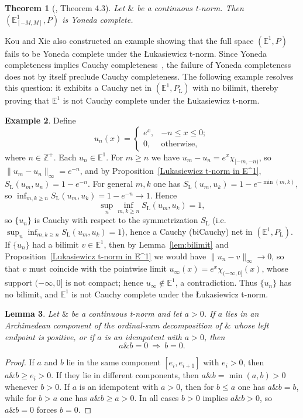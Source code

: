 \documentclass[preprint,3p,times]{elsarticle}
\theoremstyle{plain}
\newtheorem{thm}{Theorem}[section]
\newtheorem{lem}[thm]{Lemma}
\theoremstyle{definition}
\newtheorem{exmp}[thm]{Example}
\newcommand{\Luk}{\mathrm{L}}
\numberwithin{equation}{section}
\begin{document}
\begin{thm}[\cite{kouhui}, Theorem 4.3]\label{E^1_{[-M,M]} is Yoneda complete}
Let $\&$ be a  continuous t-norm. Then $(\mathbb{E}^1_{[-M,M]},P)$ is  Yoneda complete.    
\end{thm}
Kou and Xie also constructed an example showing that the full space \((\mathbb{E}^1,P)\) fails to be Yoneda complete under the {\L}ukasiewicz t-norm. Since Yoneda completeness implies Cauchy completeness~\cite{Zhang2024IntroductoryNO}, the failure of Yoneda completeness does not by itself preclude Cauchy completeness. The following example resolves  this question: it exhibits a Cauchy net in \((\mathbb{E}^1,P_{\Luk})\) with no bilimit, thereby proving that \(\mathbb{E}^1\) is not  Cauchy complete under the {\L}ukasiewicz t-norm.
\begin{exmp}\label{ex:cauchy-not-complete}
  Define 
  \[
        u_n(x)=\begin{cases}
            e^x, & -n\le x\le 0;\\
            0, & \text{otherwise},
        \end{cases}
 \]
    where \(n\in\mathbb{Z}^+\). Each $u_n\in\mathbb{E}^1$. For $m\ge n$ we have $u_m-u_n=e^x\chi_{[-m,-n)}$, so $\|u_m-u_n\|_\infty=e^{-n}$, and by Proposition~\ref{Lukasiewicz t-norm in E^1}, $S_{\Luk}(u_m,u_n)=1-e^{-n}$. For general $m,k$ one has $S_{\Luk}(u_m,u_k)=1-e^{-\min(m,k)}$, so $\inf_{m,k\ge n}S_{\Luk}(u_m,u_k)=1-e^{-n}\to1$. Hence
    \[
    \sup_n\inf_{m,k\ge n}S_{\Luk}(u_m,u_k)=1,
    \]
   so $\{u_n\}$ is Cauchy with respect to the symmetrization $S_{\Luk}$ (i.e.\ $\sup_n\inf_{m,k\ge n}S_{\Luk}(u_m,u_k)=1$), hence a Cauchy (biCauchy) net in $(\mathbb{E}^1,P_{\Luk})$.
 If $\{u_n\}$ had a bilimit $v\in\mathbb{E}^1$, then by Lemma~\ref{lem:bilimit} and Proposition~\ref{Lukasiewicz t-norm in E^1} we would have $\|u_n-v\|_\infty\to0$, so that $v$ must coincide with the pointwise limit $u_\infty(x)=e^x\chi_{(-\infty,0]}(x)$, whose support $(-\infty,0]$ is not compact; hence $u_\infty\notin\mathbb{E}^1$, a contradiction. Thus $\{u_n\}$ has no bilimit, and $\mathbb{E}^1$ is not Cauchy complete under the {\L}ukasiewicz t-norm.
\end{exmp}
\begin{lem}\label{lem:no-zero-divisors}
Let $\&$ be a continuous t-norm and let $a>0$. If $a$ lies in an Archimedean component of the ordinal-sum decomposition of $\&$ whose left endpoint is positive, or if $a$ is an idempotent with $a>0$, then
\[
a\mathbin{\&} b=0\ \Longrightarrow\ b=0 .
\]
\end{lem}
\begin{proof}
If $a$ and $b$ lie in the same component $[e_i,e_{i+1}]$ with $e_i>0$, then $a\mathbin{\&} b\ge e_i>0$. If they lie in different components, then $a\mathbin{\&} b=\min(a,b)>0$ whenever $b>0$. If $a$ is an idempotent with $a>0$, then for $b\le a$ one has $a\mathbin{\&} b=b$, while for $b>a$ one has $a\mathbin{\&} b\ge a>0$. In all cases $b>0$ implies $a\mathbin{\&} b>0$, so $a\mathbin{\&} b=0$ forces $b=0$.
\end{proof}
\end{document}
